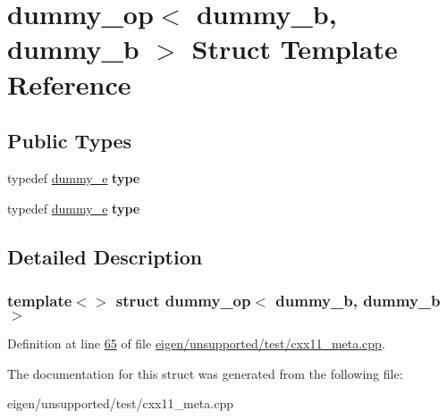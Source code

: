 \hypertarget{structdummy__op_3_01dummy__b_00_01dummy__b_01_4}{}\section{dummy\+\_\+op$<$ dummy\+\_\+b, dummy\+\_\+b $>$ Struct Template Reference}
\label{structdummy__op_3_01dummy__b_00_01dummy__b_01_4}
\subsection*{Public Types}
\begin{DoxyCompactItemize}
\item 
\mbox{\label{structdummy__op_3_01dummy__b_00_01dummy__b_01_4_ab78b82145110f93d2ba7dc079439a1f5}} 
typedef \hyperlink{structdummy__e}{dummy\+\_\+e} {\bfseries type}
\item 
\mbox{\label{structdummy__op_3_01dummy__b_00_01dummy__b_01_4_ab78b82145110f93d2ba7dc079439a1f5}} 
typedef \hyperlink{structdummy__e}{dummy\+\_\+e} {\bfseries type}
\end{DoxyCompactItemize}


\subsection{Detailed Description}
\subsubsection*{template$<$$>$\newline
struct dummy\+\_\+op$<$ dummy\+\_\+b, dummy\+\_\+b $>$}



Definition at line \hyperlink{eigen_2unsupported_2test_2cxx11__meta_8cpp_source_l00065}{65} of file \hyperlink{eigen_2unsupported_2test_2cxx11__meta_8cpp_source}{eigen/unsupported/test/cxx11\+\_\+meta.\+cpp}.



The documentation for this struct was generated from the following file\+:\begin{DoxyCompactItemize}
\item 
eigen/unsupported/test/cxx11\+\_\+meta.\+cpp\end{DoxyCompactItemize}
